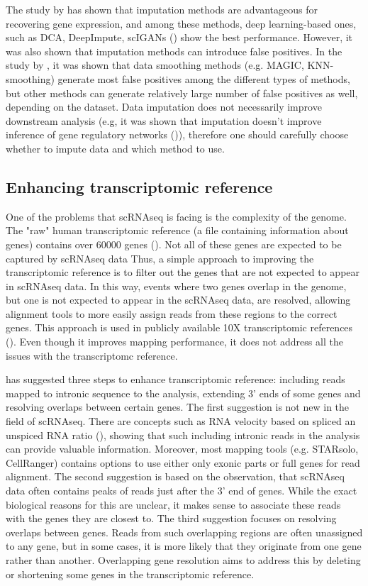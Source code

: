 The study by \textcite{Dai2022} has shown that imputation methods are advantageous for recovering gene expression,
and among these methods, deep learning-based ones,
such as DCA, DeepImpute, scIGANs (\cite{Xu2020}) show the best performance.
However, it was also shown that imputation methods can introduce false positives.
In the study by \textcite{Andrews2019}, it was shown that data smoothing methods (e.g. MAGIC, KNN-smoothing)
generate most false positives among the different types of methods,
but other methods can generate relatively large number of false positives as well, depending on the dataset.
Data imputation does not necessarily improve downstream analysis
(e.g, it was shown that imputation doesn't improve inference of gene regulatory networks (\cite{McCalla2023})),
therefore one should carefully choose whether to impute data and which method to use.

\subsection{Enhancing transcriptomic reference}

One of the problems that scRNAseq is facing is the complexity of the genome.
The "raw" human transcriptomic reference (a file containing information about genes)
contains over 60000 genes (\cite{Frankish2022}).
Not all of these genes are expected to be captured by scRNAseq data
Thus, a simple approach to improving the transcriptomic reference is to filter out the genes
that are not expected to appear in scRNAseq data.
In this way, events where two genes overlap in the genome, but one is not expected to appear in the scRNAseq data,
are resolved, allowing alignment tools to more easily assign reads from these regions to the correct genes.
This approach is used in publicly available 10X transcriptomic references (\cite{Zheng2017}).
Even though it improves mapping performance, it does not address all the issues with the transcriptomc reference.

\textcite{Pool2023} has suggested three steps to enhance transcriptomic reference:
including reads mapped to intronic sequence to the analysis, extending 3' ends of some genes and
resolving overlaps between certain genes.
The first suggestion is not new in the field of scRNAseq.
There are concepts such as RNA velocity based on spliced an unspiced RNA ratio (\cite{Manno2018}),
showing that such including intronic reads in the analysis can provide valuable information.
Moreover, most mapping tools (e.g. STARsolo, CellRanger) contains options
to use either only exonic parts or full genes for read alignment.
The second suggestion is based on the observation,
that scRNAseq data often contains peaks of reads just after the 3' end of genes. 
While the exact biological reasons for this are unclear,
it makes sense to associate these reads with the genes they are closest to. 
The third suggestion focuses on resolving overlaps between genes.
Reads from such overlapping regions are often unassigned to any gene,
but in some cases, it is more likely that they originate from one gene rather than another.
Overlapping gene resolution aims to address this by deleting or shortening some genes in the transcriptomic reference.

